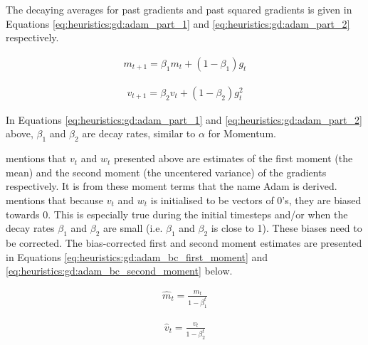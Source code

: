 The decaying averages for past gradients and past squared gradients is given in Equations \ref{eq:heuristics:gd:adam_part_1} and \ref{eq:heuristics:gd:adam_part_2} respectively.

\begin{equation}
    \label{eq:heuristics:gd:adam_part_1}
    \begin{split}
        m_{t+1} = \beta_{1}m_{t} + (1 - \beta_{1})g_{t}
    \end{split}
\end{equation}


\begin{equation}
    \label{eq:heuristics:gd:adam_part_2}
    \begin{split}
        v_{t+1} = \beta_{2}v_{t} + (1 - \beta_{2})g^{2}_{t}
    \end{split}
\end{equation}

In Equations \ref{eq:heuristics:gd:adam_part_1} and \ref{eq:heuristics:gd:adam_part_2} above, $\beta_{1}$ and $\beta_{2}$ are decay rates, similar to $\alpha$ for \ac{Momentum}.

\citeauthor{ref:ruder:2016} \cite{ref:ruder:2016} mentions that $v_{t}$ and $w_{t}$ presented above are estimates of the first moment (the mean) and the second moment (the uncentered variance) of the gradients respectively. It is from these moment terms that the name \acl{Adam} is derived. \citeauthor{ref:kingma:2014} \cite{ref:kingma:2014} mentions that because $v_{t}$ and $w_{t}$ is initialised to be vectors of 0's, they are biased towards 0. This is especially true during the initial timesteps and/or when the decay rates $\beta_{1}$ and $\beta_{2}$ are small (i.e. $\beta_{1}$ and $\beta_{2}$ is close to 1). These biases need to be corrected. The bias-corrected first and second moment estimates are presented in Equations \ref{eq:heuristics:gd:adam_bc_first_moment} and \ref{eq:heuristics:gd:adam_bc_second_moment} below.

\begin{equation}
    \label{eq:heuristics:gd:adam_bc_first_moment}
    \begin{split}
        \hat{m}_{t} = \frac{m_{t}}{1 - \beta^{t}_{1}}
    \end{split}
\end{equation}


\begin{equation}
    \label{eq:heuristics:gd:adam_bc_second_moment}
    \begin{split}
        \hat{v}_{t} = \frac{v_{t}}{1 - \beta^{t}_{2}}
    \end{split}
\end{equation}

